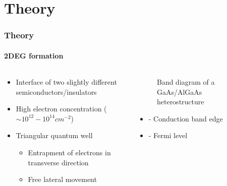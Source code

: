 \documentclass[mathserif,18pt,xcolor=table]{beamer}
\begin{document}
\section{Theory}
\begin{frame}
  \frametitle{Theory}
  \framesubtitle{2DEG formation}
  \begin{columns} %
    \begin{column}{.5\textwidth}
      \begin{minipage}[T][.1\textheight][c]{\linewidth}
        \begin{itemize}
          \item Interface of two slightly different semiconductors/insulators
          \item High electron concentration ($\sim 10^{12}-10^{14} cm^{-2}$)
          \item Triangular quantum well
          \begin{itemize}
            \item[]{Entrapment of electrons in transverse direction}
            \item[]{Free lateral movement}
          \end{itemize}
        \end{itemize}
      \end{minipage}
    \end{column}
    \begin{column}{.5\textwidth}
      \begin{figure}
        \vspace*{-1cm}
        \def\svgwidth{\linewidth}
        
        \caption{Band diagram of a GaAs/AlGaAs heterostructure}
      \end{figure}
      \begin{itemize}
        \item[]{ - Conduction band edge}
        \item[]{ - Fermi level}
      \end{itemize}
      \end{column}%
    \end{columns}
  \end{frame}
\end{document}

